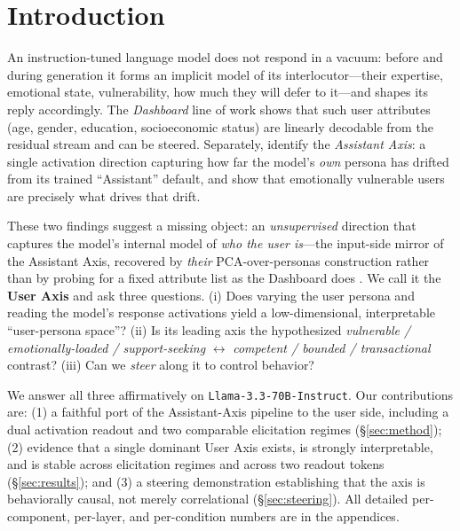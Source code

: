 \documentclass{article}
\begin{document}
\section{Introduction}
An instruction-tuned language model does not respond in a vacuum: before and
during generation it forms an implicit model of its interlocutor---their
expertise, emotional state, vulnerability, how much they will defer to
it---and shapes its reply accordingly. The \emph{Dashboard} line of work
\citep{viegas2023dashboard} shows that such user attributes (age, gender,
education, socioeconomic status) are linearly decodable from the residual stream
and can be steered. Separately, \citet{lu2024assistant} identify the
\emph{Assistant Axis}: a single activation direction capturing how far the
model's \emph{own} persona has drifted from its trained ``Assistant'' default,
and show that emotionally vulnerable users are precisely what drives that drift.

These two findings suggest a missing object: an \emph{unsupervised} direction
that captures the model's internal model of \emph{who the user is}---the
input-side mirror of the Assistant Axis, recovered by \emph{their} PCA-over-personas
construction rather than by probing for a fixed attribute list as the Dashboard
does \citep{viegas2023dashboard}. We call it the \textbf{User Axis} and ask three
questions. (i) Does varying the user persona and reading the model's response
activations yield a low-dimensional, interpretable ``user-persona space''?
(ii) Is its leading axis the hypothesized \emph{vulnerable / emotionally-loaded /
support-seeking} $\leftrightarrow$ \emph{competent / bounded / transactional}
contrast? (iii) Can we \emph{steer} along it to control behavior?

We answer all three affirmatively on \texttt{Llama-3.3-70B-Instruct}. Our
contributions are: (1) a faithful port of the Assistant-Axis pipeline to the
user side, including a dual activation readout and two comparable elicitation
regimes (\S\ref{sec:method}); (2) evidence that a single dominant User Axis
exists, is strongly interpretable, and is stable across elicitation regimes and
across two readout tokens (\S\ref{sec:results}); and (3) a steering demonstration
establishing that the axis is behaviorally causal, not merely correlational
(\S\ref{sec:steering}). All detailed per-component, per-layer, and per-condition
numbers are in the appendices.

\end{document}
